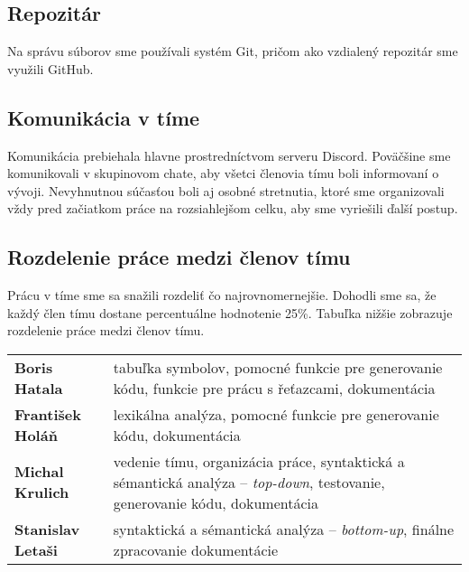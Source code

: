 \documentclass[a4paper,11pt]{article}
\begin{document}
\subsection{Repozitár}
Na správu súborov sme používali systém Git, pričom ako vzdialený repozitár sme využili GitHub.

\subsection{Komunikácia v tíme}
Komunikácia prebiehala hlavne prostredníctvom serveru Discord. Poväčšine sme komunikovali v skupinovom chate, aby všetci členovia tímu boli informovaní o vývoji.
Nevyhnutnou súčasťou boli aj osobné stretnutia, ktoré sme organizovali vždy pred začiatkom práce na rozsiahlejšom celku, aby sme vyriešili ďalší postup.
\newpage
\subsection{Rozdelenie práce medzi členov tímu}
Prácu v tíme sme sa snažili rozdeliť čo najrovnomernejšie. Dohodli sme sa, že každý člen tímu dostane percentuálne hodnotenie 25\%. Tabuľka nižšie zobrazuje rozdelenie práce medzi členov tímu.

\medskip

\begin{tabular}{lp{11.9cm}}
	\textbf{Boris Hatala} & tabuľka symbolov, pomocné funkcie pre generovanie kódu, funkcie pre prácu s řeťazcami, dokumentácia \\
	\textbf{František Holáň}  & lexikálna analýza, pomocné funkcie pre generovanie kódu, dokumentácia \\
	\textbf{Michal Krulich} & vedenie tímu, organizácia práce, syntaktická a sémantická analýza – \textit{top-down}, testovanie, generovanie kódu, dokumentácia \\
	\textbf{Stanislav Letaši} & syntaktická a sémantická analýza – \textit{bottom-up}, finálne zpracovanie dokumentácie \\
\end{tabular}


\medskip
\appendix
\end{document}
